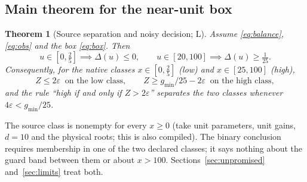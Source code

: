 \documentclass[11pt]{article}
\theoremstyle{plain}
\newtheorem{theorem}{Theorem}[section]
\theoremstyle{definition}
\numberwithin{equation}{section}
\newcommand{\eps}{\varepsilon}
\newcommand{\gmin}{g_{\min}}
\newcommand{\Lean}{\textsf{L}}   %
\begin{document}
\subsection{Main theorem for the near-unit box}
\begin{theorem}[Source separation and noisy decision; \Lean]\label{thm:main}
Assume \eqref{eq:balance}, \eqref{eq:obs} and the box \eqref{eq:box}. Then
\begin{equation}\label{eq:margin}
 u\in[0,\tfrac25]\implies\Delta(u)\le0,\qquad
 u\in[20,100]\implies\Delta(u)\ge\tfrac1{25}.
\end{equation}
Consequently, for the native classes $x\in[0,\tfrac25]$ (low) and $x\in[25,100]$ (high),
\begin{equation}\label{eq:noisy}
 Z\le2\eps\ \text{ on the low class},\qquad
 Z\ge\gmin/25-2\eps\ \text{ on the high class},
\end{equation}
and the rule ``high if and only if $Z>2\eps$'' separates the two classes whenever
$4\eps<\gmin/25$.
\end{theorem}

The source class is nonempty for every $x\ge0$ (take unit parameters, unit gains,
$d=10$ and the physical roots; this is also compiled). The binary conclusion
requires membership in one of the two declared classes; it says nothing about the
guard band between them or about $x>100$. Sections~\ref{sec:unpromised}
and~\ref{sec:limits} treat both.
\end{document}
